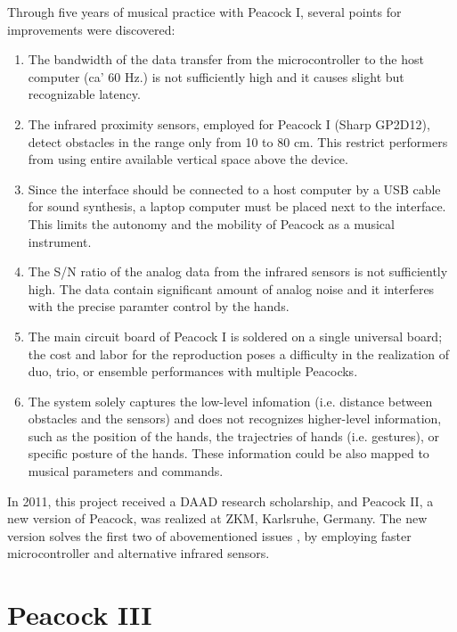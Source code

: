 \documentclass{nime-alternate}
\begin{document}
Through five years of musical practice with Peacock I, several points for improvements were discovered:

\begin{enumerate}
\item The bandwidth of the data transfer from the microcontroller to the host computer (ca' 60 Hz.) is not sufficiently high and it causes slight but recognizable latency.

\item The infrared proximity sensors, employed for Peacock I (Sharp GP2D12), detect obstacles in the range only from 10 to 80 cm. This restrict performers from using entire available vertical space above the device. 

\item Since the interface should be connected to a host computer by a USB cable for sound synthesis, a laptop computer must be placed next to the interface. This limits the autonomy and the mobility of Peacock as a musical instrument.

\item The S/N ratio of the analog data from the infrared sensors is not sufficiently high. The data contain significant amount of analog noise and it interferes with the precise paramter control by the hands.

\item The main circuit board of Peacock I is soldered on a single universal board; the cost and labor for the reproduction poses a difficulty in the realization of duo, trio, or ensemble performances with multiple Peacocks.

\item The system solely captures the low-level infomation (i.e. distance between obstacles and the sensors) and does not recognizes higher-level information, such as the position of the hands, the trajectries of hands (i.e. gestures), or specific posture of the hands. These information could be also mapped to musical parameters and commands.

\end{enumerate}

In 2011, this project received a DAAD research scholarship, and Peacock II, a new version of Peacock, was realized at ZKM, Karlsruhe, Germany. The new version solves the first two of abovementioned issues , by employing faster microcontroller\cite{parallax:propeller} and alternative infrared sensors.

\section{Peacock III}
\end{document}
